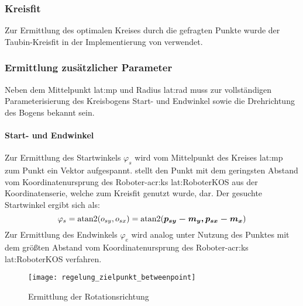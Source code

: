 \subsubsection{Kreisfit} 
Zur Ermittlung des optimalen Kreises durch die gefragten Punkte wurde der Taubin-Kreisfit \autocite{taubinEstimationPlanarCurves1991} in der Implementierung von \autocite{nikolaichernovMATLABCodesFitting} verwendet. 

\subsubsection{Ermittlung zusätzlicher Parameter}
Neben dem Mittelpunkt \gls{lat:mp} und Radius \gls{lat:rad} muss zur vollständigen Parameterisierung des Kreisbogens Start- und Endwinkel sowie die Drehrichtung des Bogens bekannt sein.

\paragraph{Start- und Endwinkel}
Zur Ermittlung des Startwinkels \( \varphi_s \) wird vom Mittelpunkt des Kreises \gls{lat:mp} zum Punkt  ein Vektor  aufgespannt.  stellt den Punkt mit dem geringsten Abstand vom Koordinatenursprung des Roboter-\gls{acr:ks} \gls{lat:RoboterKOS} aus der Koordinatenserie, welche zum Kreisfit genutzt wurde, dar. Der gesuchte Startwinkel ergibt sich als:
\begin{equation}
\varphi_s =
\operatorname{atan2} (o_{sy}, o_{sx}) = 
\operatorname{atan2} (\boldsymbol{p_{sy}-m_{y}, p_{sx}-m_{x}})
\end{equation}
Zur Ermittlung des Endwinkels \( \varphi_e \) wird analog unter Nutzung des Punktes mit dem größten Abstand vom Koordinatenursprung des Roboter-\gls{acr:ks} \gls{lat:RoboterKOS} verfahren.

\begin{figure}[htb]
  \centering
  \texttt{[image: regelung\_zielpunkt\_betweenpoint]}
  \caption{Ermittlung der Rotationsrichtung}
  \label{fig:regelung:zielpunkt:betweenpoint}
\end{figure}

